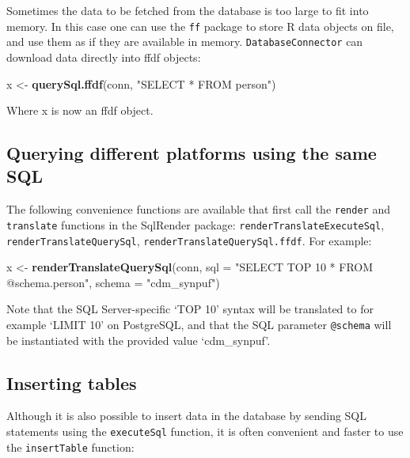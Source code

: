 \documentclass[]{book}
\newenvironment{Shaded}{\begin{snugshade}}{\end{snugshade}}
\newcommand{\KeywordTok}[1]{\textcolor[rgb]{0.13,0.29,0.53}{\textbf{#1}}}
\newcommand{\DataTypeTok}[1]{\textcolor[rgb]{0.13,0.29,0.53}{#1}}
\newcommand{\StringTok}[1]{\textcolor[rgb]{0.31,0.60,0.02}{#1}}
\newcommand{\NormalTok}[1]{#1}
\begin{document}
Sometimes the data to be fetched from the database is too large to fit
into memory. In this case one can use the \texttt{ff} package to store R
data objects on file, and use them as if they are available in memory.
\texttt{DatabaseConnector} can download data directly into ffdf objects:

\begin{Shaded}
\begin{Highlighting}[]
\NormalTok{x <-}\StringTok{ }\KeywordTok{querySql.ffdf}\NormalTok{(conn, }\StringTok{"SELECT * FROM person"}\NormalTok{)}
\end{Highlighting}
\end{Shaded}

Where x is now an ffdf object.

\subsection{Querying different platforms using the same
SQL}\label{querying-different-platforms-using-the-same-sql}

The following convenience functions are available that first call the
\texttt{render} and \texttt{translate} functions in the SqlRender
package: \texttt{renderTranslateExecuteSql},
\texttt{renderTranslateQuerySql}, \texttt{renderTranslateQuerySql.ffdf}.
For example:

\begin{Shaded}
\begin{Highlighting}[]
\NormalTok{x <-}\StringTok{ }\KeywordTok{renderTranslateQuerySql}\NormalTok{(conn, }
                             \DataTypeTok{sql =} \StringTok{"SELECT TOP 10 * FROM @schema.person"}\NormalTok{,}
                             \DataTypeTok{schema =} \StringTok{"cdm_synpuf"}\NormalTok{)}
\end{Highlighting}
\end{Shaded}

Note that the SQL Server-specific `TOP 10' syntax will be translated to
for example `LIMIT 10' on PostgreSQL, and that the SQL parameter
\texttt{@schema} will be instantiated with the provided value
`cdm\_synpuf'.

\subsection{Inserting tables}\label{inserting-tables}

Although it is also possible to insert data in the database by sending
SQL statements using the \texttt{executeSql} function, it is often
convenient and faster to use the \texttt{insertTable} function:
\end{document}
